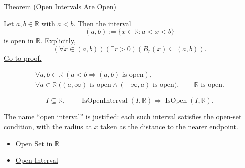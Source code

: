 \begin{theorembox}{Theorem (Open Intervals Are Open)}
\begin{theorem}
\label{thm:open-interval-is-open}
Let $a,b\in\mathbb{R}$ with $a<b$.  Then the interval
\[
  (a,b):=\{x\in\mathbb{R}:a<x<b\}
\]
is open in $\mathbb{R}$.  Explicitly,
\[
  (\forall x\in(a,b))(\exists r>0)(B_r(x)\subseteq(a,b)).
\]
\hyperref[prf:open-interval-is-open]{Go to proof.}
\end{theorem}
\end{theorembox}
\begin{remark*}
\[
\begin{gathered}
\forall a,b\in\mathbb{R}\;(a<b\Longrightarrow (a,b)\text{ is open}),\\
\forall a\in\mathbb{R}\;\bigl((a,\infty)\text{ is open}\land(-\infty,a)\text{ is open}\bigr),
\qquad \mathbb{R}\text{ is open}.
\end{gathered}
\]
\end{remark*}

\begin{remark*}
\[
I\subseteq\mathbb{R},\qquad
\operatorname{IsOpenInterval}(I,\mathbb{R})
\Longrightarrow
\operatorname{IsOpen}(I,\mathbb{R}).
\]
\end{remark*}
\begin{remark*}[Interpretation]
The name ``open interval'' is justified: each such interval satisfies the open-set condition, with the radius at $x$ taken as the distance to the nearer endpoint.
\end{remark*}
\begin{dependencies}
\begin{itemize}
  \item \hyperref[def:open-set]{Open Set in $\mathbb{R}$}
  \item \hyperref[def:open-interval]{Open Interval}
\end{itemize}
\end{dependencies}
